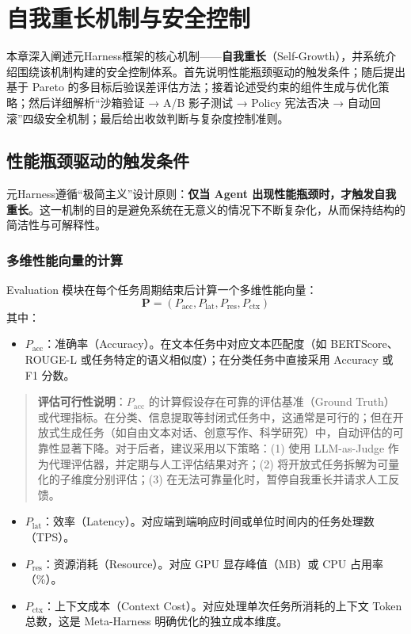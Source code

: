 \chapter{自我重长机制与安全控制}

本章深入阐述元Harness框架的核心机制——\textbf{自我重长}（Self-Growth），并系统介绍围绕该机制构建的安全控制体系。首先说明性能瓶颈驱动的触发条件；随后提出基于 Pareto 的多目标后验误差评估方法；接着论述受约束的组件生成与优化策略；然后详细解析“沙箱验证 → A/B 影子测试 → Policy 宪法否决 → 自动回滚”四级安全机制；最后给出收敛判断与复杂度控制准则。

\section{性能瓶颈驱动的触发条件}

元Harness遵循“极简主义”设计原则：\textbf{仅当 Agent 出现性能瓶颈时，才触发自我重长}。这一机制的目的是避免系统在无意义的情况下不断复杂化，从而保持结构的简洁性与可解释性。

\subsection{多维性能向量的计算}

Evaluation 模块在每个任务周期结束后计算一个多维性能向量：
\begin{equation}
\mathbf{P} = (P_{\text{acc}}, P_{\text{lat}}, P_{\text{res}}, P_{\text{ctx}})
\end{equation}
其中：
\begin{itemize}
    \item $P_{\text{acc}}$：准确率（Accuracy）。在文本任务中对应文本匹配度（如 BERTScore、ROUGE-L 或任务特定的语义相似度）；在分类任务中直接采用 Accuracy 或 F1 分数。
\end{itemize}

\begin{quote}
\textbf{评估可行性说明}：$P_{\text{acc}}$ 的计算假设存在可靠的评估基准（Ground Truth）或代理指标。在分类、信息提取等封闭式任务中，这通常是可行的；但在开放式生成任务（如自由文本对话、创意写作、科学研究）中，自动评估的可靠性显著下降。对于后者，建议采用以下策略：(1) 使用 LLM-as-Judge 作为代理评估器，并定期与人工评估结果对齐；(2) 将开放式任务拆解为可量化的子维度分别评估；(3) 在无法可靠量化时，暂停自我重长并请求人工反馈。
\end{quote}

\begin{itemize}
    \item $P_{\text{lat}}$：效率（Latency）。对应端到端响应时间或单位时间内的任务处理数（TPS）。
    \item $P_{\text{res}}$：资源消耗（Resource）。对应 GPU 显存峰值（MB）或 CPU 占用率（\%）。
    \item $P_{\text{ctx}}$：上下文成本（Context Cost）。对应处理单次任务所消耗的上下文 Token 总数，这是 Meta-Harness 明确优化的独立成本维度。
\end{itemize}

